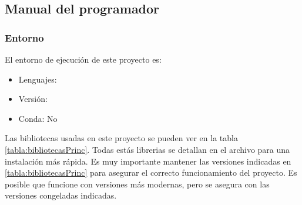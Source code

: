 \subsection{Manual del programador}

\subsubsection{Entorno}

El entorno de ejecución de este proyecto es:

\begin{itemize}
  \item Lenguajes: 
  \item Versión: 
  \item Conda: No
\end{itemize}

Las bibliotecas usadas en este proyecto se pueden ver en la tabla \ref{tabla:bibliotecasPrinc}. Todas estás librerias se detallan en el archivo  para una instalación más rápida. Es muy importante mantener las versiones indicadas en \ref{tabla:bibliotecasPrinc} para asegurar el correcto funcionamiento del proyecto. Es posible que funcione con versiones más modernas, pero se asegura con las versiones congeladas indicadas.

